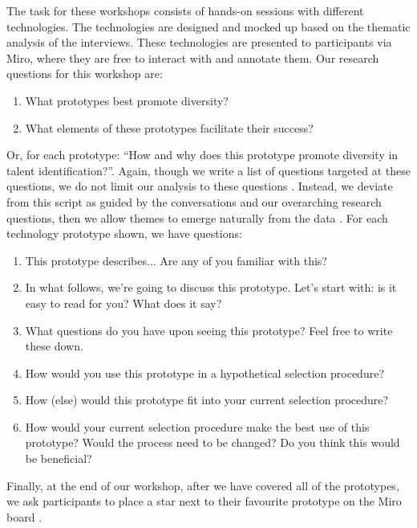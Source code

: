 The task for these workshops consists of hands-on sessions with different technologies. The technologies are designed and mocked up based on the thematic analysis of the interviews. These technologies are presented to participants via Miro, where they are free to interact with and annotate them. Our research questions for this workshop are:

\begin{enumerate}
    \item What prototypes best promote diversity?
    \item What elements of these prototypes facilitate their success?
\end{enumerate}

Or, for each prototype: ``How and why does this prototype promote diversity in talent identification?''. Again, though we write a list of questions targeted at these questions, we do not limit our analysis to these questions \cite{braun_using_2006}. Instead, we deviate from this script as guided by the conversations and our overarching research questions, then we allow themes to emerge naturally from the data \cite{braun_using_2006}. For each technology prototype shown, we have questions:

\begin{enumerate}
    \item This prototype describes... Are any of you familiar with this?
    \item In what follows, we're going to discuss this prototype. Let's start with: is it easy to read for you? What does it say? 
    \item What questions do you have upon seeing this prototype? Feel free to write these down.
    \item How would you use this prototype in a hypothetical selection procedure?
    \item How (else) would this prototype fit into your current selection procedure?
    \item How would your current selection procedure make the best use of this prototype? Would the process need to be changed? Do you think this would be beneficial?
\end{enumerate}

Finally, at the end of our workshop, after we have covered all of the prototypes, we ask participants to place a star next to their favourite prototype on the Miro board \cite{Gatian_1994,Griffiths_Johnson_Hartley_2007}.